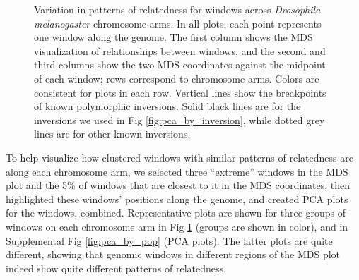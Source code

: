\documentclass[11pt, oneside]{article}   	%
\newcommand{\Figure}{Fig }
\newcommand{\Figure}{{Figure }}
\begin{document}
\begin{figure}
\begin{center}
       \fi
    \end{center}
    \caption{
        Variation in patterns of relatedness for windows across \textit{Drosophila melanogaster} chromosome arms.
        In all plots, each point represents one window along the genome.
         The first column shows the MDS visualization of relationships between windows, 
         and the second and third columns show 
        the two MDS coordinates
         against the midpoint of each window;
         rows correspond to chromosome arms.
         Colors are consistent for plots in each row. 
         Vertical lines show the breakpoints of known polymorphic inversions.   
         Solid black lines are for the inversions we used in \Figure \ref{fig:pca_by_inversion},
         while dotted grey lines are for other known inversions.     
         \label{fig:mds_allchr}
    }
\end{figure}



To help visualize how clustered windows with similar patterns of relatedness are along each chromosome arm, 
we selected three ``extreme'' windows in the MDS plot
and the 5\% of windows that are closest to it in the MDS coordinates,
then highlighted these windows' positions along the genome,
and created PCA plots for the windows, combined.
Representative plots are shown for three groups of windows on each chromosome arm
in \Figure \ref{fig:mds_allchr} (groups are shown in color),
and in Supplemental \Figure \ref{fig:pca_by_pop} (PCA plots).
The latter plots are quite different,
showing that genomic windows in different regions of the MDS plot indeed show quite different patterns of relatedness.
\end{document}
